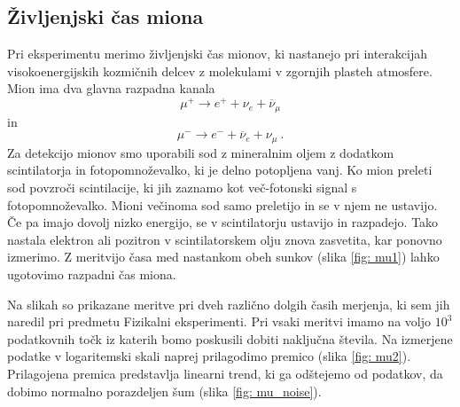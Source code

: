 \documentclass[11pt, oneside]{article}
\theoremstyle{definition}
\begin{document}
\subsection{Življenjski čas miona}
Pri eksperimentu merimo življenjski čas mionov, ki nastanejo pri interakcijah visokoenergijskih kozmičnih
delcev z molekulami v zgornjih plasteh atmosfere. Mion ima dva glavna razpadna kanala
\begin{equation}
    \mu^+ \rightarrow e^+ + \nu_e + \overline{\nu}_\mu
\end{equation}
in
\begin{equation}
    \mu^- \rightarrow e^- + \overline{\nu}_e + \nu_\mu \>.
\end{equation}
Za detekcijo mionov smo uporabili sod z mineralnim oljem z dodatkom scintilatorja in fotopomnoževalko, ki je
delno potopljena vanj. Ko mion preleti sod povzroči scintilacije, ki jih zaznamo kot več-fotonski signal s
fotopomnoževalko. Mioni večinoma sod samo preletijo in se v njem ne ustavijo.
Če pa imajo dovolj nizko energijo, se v scintilatorju ustavijo in razpadejo.
Tako nastala elektron ali pozitron v scintilatorskem olju znova zasvetita, kar ponovno izmerimo.
Z meritvijo časa med nastankom obeh sunkov (slika \ref{fig: mu1}) lahko ugotovimo razpadni čas miona.

\newpage
Na slikah so prikazane meritve pri dveh različno dolgih časih merjenja, ki sem jih naredil pri
predmetu Fizikalni eksperimenti. Pri vsaki meritvi imamo na voljo $10^3$ podatkovnih točk iz
katerih bomo poskusili dobiti naključna števila. Na izmerjene podatke v logaritemski skali naprej prilagodimo
premico (slika \ref{fig: mu2}). Prilagojena premica predstavlja linearni trend, ki ga odštejemo od podatkov,
da dobimo normalno porazdeljen šum (slika \ref{fig: mu_noise}).

\end{document}
